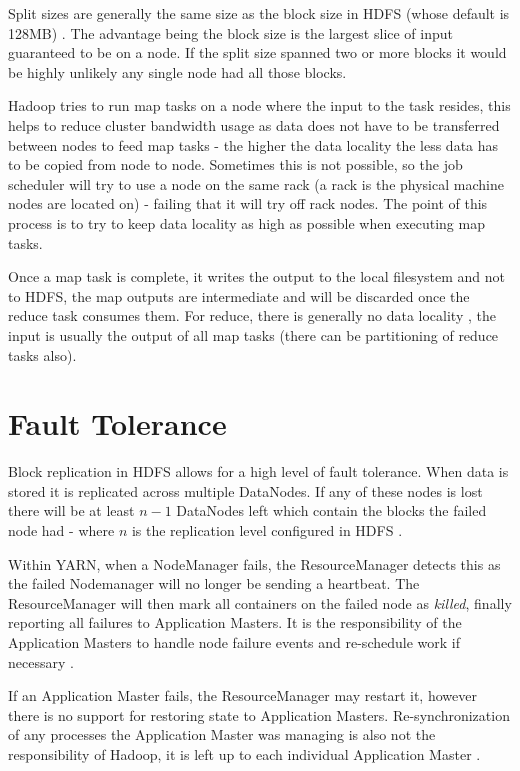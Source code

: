 \documentclass[conference]{IEEEtran}
\begin{document}
Split sizes are generally the same size as the block size in HDFS (whose default is 128MB) \cite{hdfs}. The advantage being the block size is the largest slice of input guaranteed to be on a node. If the split size spanned two or more blocks it would be highly unlikely any single node had all those blocks.

Hadoop tries to run map tasks on a node where the input to the task resides, this helps to reduce cluster bandwidth usage as data does not have to be transferred between nodes to feed map tasks - the higher the data locality the less data has to be copied from node to node. Sometimes this is not possible, so the job scheduler will try to use a node on the same rack (a rack is the physical machine nodes are located on) - failing that it will try off rack nodes. The point of this process is to try to keep data locality as high as possible when executing map tasks.

Once a map task is complete, it writes the output to the local filesystem and not to HDFS, the map outputs are intermediate and will be discarded once the reduce task consumes them. For reduce, there is generally no data locality , the input is usually the output of all map tasks (there can be partitioning of reduce tasks also).

\section{Fault Tolerance}
Block replication in HDFS allows for a high level of fault tolerance. When data is stored it is replicated across multiple DataNodes. If any of these nodes is lost there will be at least $n - 1$ DataNodes left which contain the blocks the failed node had - where $n$ is the replication level configured in HDFS \cite{hdfs}.

Within YARN, when a NodeManager fails, the ResourceManager detects this as the failed Nodemanager will no longer be sending a heartbeat. The ResourceManager will then mark all containers on the failed node as \emph{killed}, finally reporting all failures to Application Masters. It is the responsibility of the Application Masters to handle node failure events and re-schedule work if necessary \cite{yarn}.

If an Application Master fails, the ResourceManager may restart it, however there is no support for restoring state to Application Masters. Re-synchronization of any processes the Application Master was managing is also not the responsibility of Hadoop, it is left up to each individual Application Master \cite{yarn}.
\end{document}
